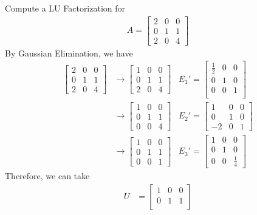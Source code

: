 \begin{exmp}
Compute a LU Factorization for
\begin{align*}
A = 
\begin{bmatrix}
2 & 0 & 0 \\
0 & 1 & 1 \\
2 & 0 & 4
\end{bmatrix}
\end{align*}
By Gaussian Elimination, we have
\begin{align*}
\begin{bmatrix}
2 & 0 & 0 \\
0 & 1 & 1 \\
2 & 0 & 4
\end{bmatrix}
&\rightarrow 
\begin{bmatrix}
1 & 0 & 0 \\
0 & 1 & 1 \\
2 & 0 & 4 
\end{bmatrix}
& E_1' =
\begin{bmatrix}
\frac{1}{2} & 0 & 0 \\
0 & 1 & 0 \\
0 & 0 & 1 \\
\end{bmatrix}
\\
&\rightarrow 
\begin{bmatrix}
1 & 0 & 0 \\
0 & 1 & 1 \\
0 & 0 & 4 
\end{bmatrix}
&
E_2' =
\begin{bmatrix}
1 & 0 & 0 \\
0 & 1 & 0 \\
-2 & 0 & 1 
\end{bmatrix}
\\
&\rightarrow 
\begin{bmatrix}
1 & 0 & 0 \\
0 & 1 & 1 \\
0 & 0 & 1
\end{bmatrix}
&
E_3' = 
\begin{bmatrix}
1 & 0 & 0 \\
0 & 1 & 0 \\
0 & 0 & \frac{1}{4}
\end{bmatrix}
\end{align*}
Therefore, we can take
\begin{align*}
U &= 
\begin{bmatrix}
1 & 0 & 0 \\
0 & 1 & 1 \\

\end{bmatrix}
\end{align*}
\end{exmp}
